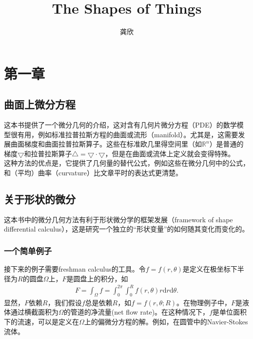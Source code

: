 \documentclass[12pt,a4paper]{article}
\title{The Shapes of Things}
\author{龚欣}
\date{\chntoday}
\begin{document}
\maketitle
\section{第一章}
\subsection{曲面上微分方程}
这本书提供了一个微分几何的介绍，这对含有几何片微分方程（PDE）的数学模型很有用，例如标准拉普拉斯方程的曲面或流形（manifold）。尤其是，这需要发展曲面梯度和曲面拉普拉斯算子。这些在标准欧几里得空间里（如$\mathbb{R}^n$）是普通的梯度$\bigtriangledown$和拉普拉斯算子$\bigtriangleup=\bigtriangledown \cdot \bigtriangledown$，但是在曲面或流体上定义就会变得特殊。\\

这种方法的优点是，它提供了几何量的替代公式，例如这些在微分几何中的公式，和（平均）曲率（curvature）比文章平时的表达式更清楚。

\subsection{关于形状的微分}
这本书中的微分几何方法有利于形状微分学的框架发展（framework of shape differential calculus），这是研究一个独立的“形状变量”的如何随其变化而变化的。

\subsubsection{一个简单例子}
接下来的例子需要freshman calculus的工具。令$f=f(r,\theta)$是定义在极坐标下半径为$R$的圆盘$\Omega$上，$F$是圆盘上的积分，如
\begin{equation}
\begin{aligned}
F=\int_{\Omega} f=\int_{0}^{2\pi}\int_{0}^{R} f(r,\theta)r\mathrm{d}r\mathrm{d}\theta.
\end{aligned}
\end{equation}
显然，$F$依赖$R$，我们假设$f$总是依赖$R$，如$f=f(r,\theta;R)$。在物理例子中，$F$是液体通过横截面积为$\Omega$的管道的净流量(net flow rate)。在这种情况下，$f$是单位面积下的流速，可以是定义在$\Omega$上的偏微分方程的解。例如，在圆管中的Navier-Stokes流体。
\end{document}
